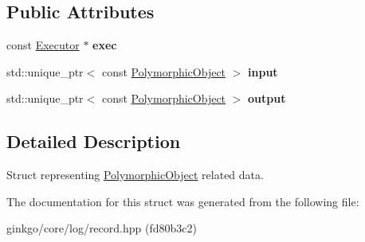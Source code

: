 \subsection*{Public Attributes}
\begin{DoxyCompactItemize}
\item 
\mbox{\label{structgko_1_1log_1_1polymorphic__object__data_a673a2c661ae7c582475d044cf37a8ec2}} 
const \hyperlink{classgko_1_1Executor}{Executor} $\ast$ {\bfseries exec}
\item 
\mbox{\label{structgko_1_1log_1_1polymorphic__object__data_a835d796a090caae61492e27e657e09d8}} 
std\+::unique\+\_\+ptr$<$ const \hyperlink{classgko_1_1PolymorphicObject}{Polymorphic\+Object} $>$ {\bfseries input}
\item 
\mbox{\label{structgko_1_1log_1_1polymorphic__object__data_a47d7c908e465c205de05fc7e4aac7613}} 
std\+::unique\+\_\+ptr$<$ const \hyperlink{classgko_1_1PolymorphicObject}{Polymorphic\+Object} $>$ {\bfseries output}
\end{DoxyCompactItemize}


\subsection{Detailed Description}
Struct representing \hyperlink{classgko_1_1PolymorphicObject}{Polymorphic\+Object} related data. 



The documentation for this struct was generated from the following file\+:\begin{DoxyCompactItemize}
\item 
ginkgo/core/log/record.\+hpp (fd80b3c2)\end{DoxyCompactItemize}
